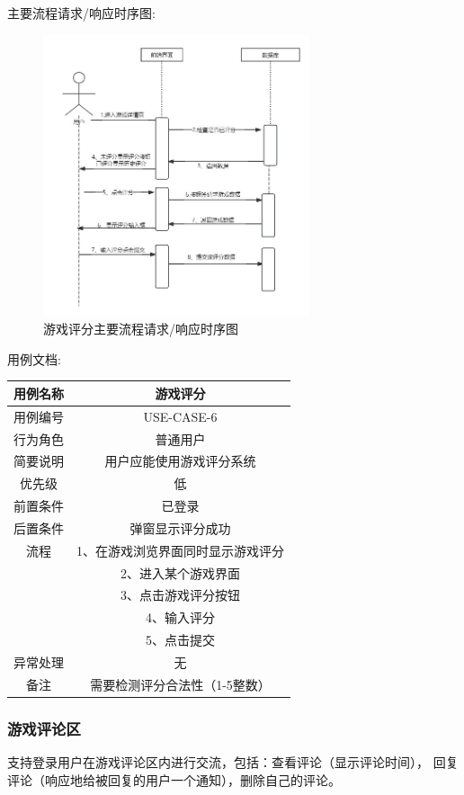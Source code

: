 \documentclass[12pt]{ctexart} %
\begin{document}
主要流程请求/响应时序图:
\begin{figure}[h]
  \centering
  \includegraphics[width=0.7\textwidth]{yongli6.jpg}
  \caption{游戏评分主要流程请求/响应时序图}
\end{figure}
用例文档:

\begin{tabular}{|c|c|}
  \hline
  用例名称& 游戏评分\\
  \hline
  用例编号 & USE-CASE-6\\
  \hline
  行为角色 & 普通用户\\
  \hline
  简要说明 & 用户应能使用游戏评分系统\\
  \hline
  优先级 & 低\\
  \hline
  前置条件 & 已登录\\
  \hline
  后置条件 & 弹窗显示评分成功\\
  \hline
  流程 & 1、在游戏浏览界面同时显示游戏评分\\
      & 2、进入某个游戏界面\\
      &  3、点击游戏评分按钮\\
      &  4、输入评分\\
      &  5、点击提交\\
  \hline
  异常处理 & 无\\
  \hline
  备注 & 需要检测评分合法性（1-5整数）\\
  \hline
\end{tabular}

\subsubsection{游戏评论区}
支持登录用户在游戏评论区内进行交流，包括：查看评论（显示评论时间），
回复评论（响应地给被回复的用户一个通知），删除自己的评论。
\end{document}
